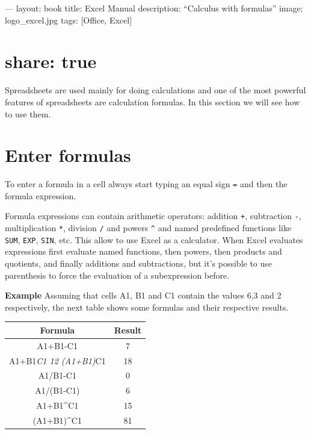 ---
layout: book
title: Excel Manual
description: ``Calculus with formulas''
image: logo\_excel.jpg
tags: [Office, Excel]

\chapter{share: true}
\label{share:true}

Spreadsheets are used mainly for doing calculations and one of the most powerful features of spreadsheets are calculation formulas. In this section we will see how to use them. 

\chapter{Enter formulas}
\label{enterformulas}

To enter a formula in a cell always start typing an equal sign \texttt{=} and then the formula expression. 

Formula expressions can contain arithmetic operators: addition \texttt{+}, subtraction \texttt{-}, multiplication \texttt{*}, division \texttt{\slash } and powers \texttt{\^{}} and named predefined functions like \texttt{SUM}, \texttt{EXP}, \texttt{SIN}, etc. This allow to use Excel as a calculator. When Excel evaluates expressions first evaluate named functions, then powers, then products and quotients, and finally additions and subtractions, but it's possible to use parenthesis to force the evaluation of a subexpression before.

\textbf{Example} Assuming that cells A1, B1 and C1 contain the values 6,3 and 2 respectively, the next table shows some formulas and their respective results. 

\begin{table}[htbp]
\begin{minipage}{\linewidth}
\setlength{\tymax}{0.5\linewidth}
\centering
\small
\begin{tabulary}{\textwidth}{@{}CC@{}} \toprule
Formula&Result\\
\midrule
A1+B1-C1&7\\
A1+B1\emph{C1 \textbar{} 12 \textbar{}
\textbar{}(A1+B1)}C1&18\\
A1\slash B1-C1&0\\
A1\slash (B1-C1)&6\\
A1+B1\^{}C1&15\\
(A1+B1)\^{}C1&81\\

\bottomrule

\end{tabulary}
\end{minipage}
\end{table}




